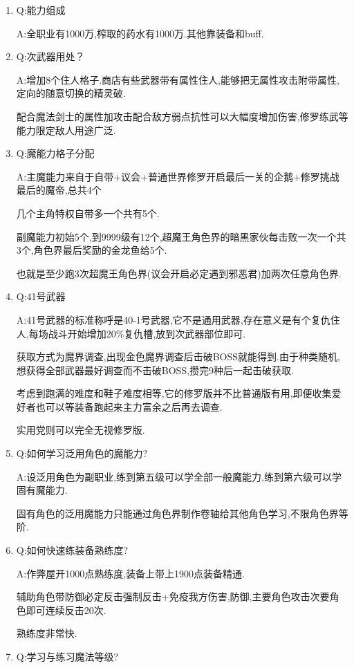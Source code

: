 \begin{enumerate}
	\item
	Q:能力组成

	A:全职业有1000万,榨取的药水有1000万.其他靠装备和buff.

	\item
	Q:次武器用处？

	A:增加8个住人格子.商店有些武器带有属性住人,能够把无属性攻击附带属性,定向的随意切换的精灵破.

	配合魔法剑士的属性加攻击配合敌方弱点抗性可以大幅度增加伤害,修罗练武等能力限定敌人用途广泛.

	\item
	Q:魔能力格子分配

	A:主魔能力来自于自带+议会+普通世界修罗开启最后一关的企鹅+修罗挑战最后的魔帝,总共4个

	几个主角特权自带多一个共有5个.
	
	副魔能力初始5个,到9999级有12个,超魔王角色界的暗黑家伙每击败一次一个共3个,角色界最后奖励的金龙鱼给5个.

	也就是至少跑3次超魔王角色界(议会开启必定遇到邪恶君)加两次任意角色界.

	\item
	Q:41号武器

	A:41号武器的标准称呼是40-1号武器,它不是通用武器,存在意义是有个复仇住人,每场战斗开始增加20\%复仇槽,放到次武器部位即可.

	获取方式为魔界调查,出现金色魔界调查后击破BOSS就能得到.由于种类随机,想获得全部武器最好调查而不击破BOSS,攒完9种后一起击破获取.

	考虑到跑满的难度和鞋子难度相等,它的修罗版并不比普通版有用,即便收集爱好者也可以等装备跑起来主力富余之后再去调查.

	实用党则可以完全无视修罗版.

	\item
	Q:如何学习泛用角色的魔能力?

	A:设泛用角色为副职业,练到第五级可以学全部一般魔能力,练到第六级可以学固有魔能力.

	固有角色的泛用魔能力只能通过角色界制作卷轴给其他角色学习,不限角色界等阶.

	\item
	Q:如何快速练装备熟练度?

	A:作弊屋开1000点熟练度,装备上带上1900点装备精通.

	辅助角色带防御必定反击强制反击+免疫我方伤害,防御,主要角色攻击次要角色即可连续反击20次.

	熟练度非常快.

	\item
	Q:学习与练习魔法等级?
	

\end{enumerate}
